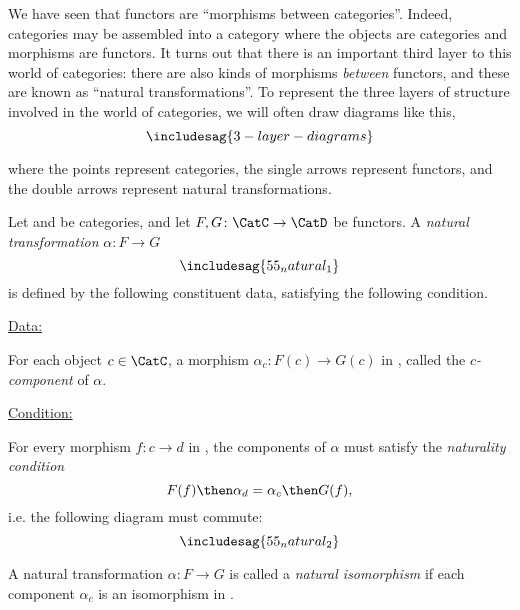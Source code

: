 
We have seen that functors are ``morphisms between categories''. Indeed, categories may be assembled into a category \Category where the objects are categories and morphisms are functors. It turns out that there is an important third layer to this world of categories: there are also kinds of morphisms \emph{between} functors, and these are known as ``natural transformations''. To represent the three layers of structure involved in the world of categories, we will often draw diagrams like this,
\begin{equation}
  \includesag{3-layer-diagrams}
\end{equation}


where the points represent categories, the single arrows represent functors, and the double arrows represent natural transformations.


\begin{ctdefinition}
  Let \CatC and \CatD be categories, and let $F,G\colon \CatC\to \CatD$ be functors. A \emph{natural transformation} $\alpha\colon F\to G$
  \begin{equation}
    \includesag{55_natural_1}
  \end{equation}
  is defined by the following constituent data, satisfying the following condition.

  \underline{Data:}
  \begin{compactenum}
    \item For each object $c\in \CatC$, a morphism $\alpha_c\colon F(c)\to G(c)$ in \CatD, called the $c$\emph{-component} of $\alpha$.
  \end{compactenum}
  \underline{Condition:}
  \begin{compactenum}
    \item For every morphism $f\colon c\to d$ in \CatC, the components of $\alpha$ must satisfy the \emph{naturality condition}
    \begin{equation}
      F(f)\then \alpha_d = \alpha_c\then G(f),
    \end{equation}
    i.e. the following diagram must commute:
    \begin{equation}
      \includesag{55_natural_2}
    \end{equation}
  \end{compactenum}
\end{ctdefinition}

\begin{ctdefinition}
  \label{def:nat_iso}
  A natural transformation $\alpha\colon F\to G$ is called a \emph{natural isomorphism} if each component $\alpha_c$ is an isomorphism in \CatD.
\end{ctdefinition}

